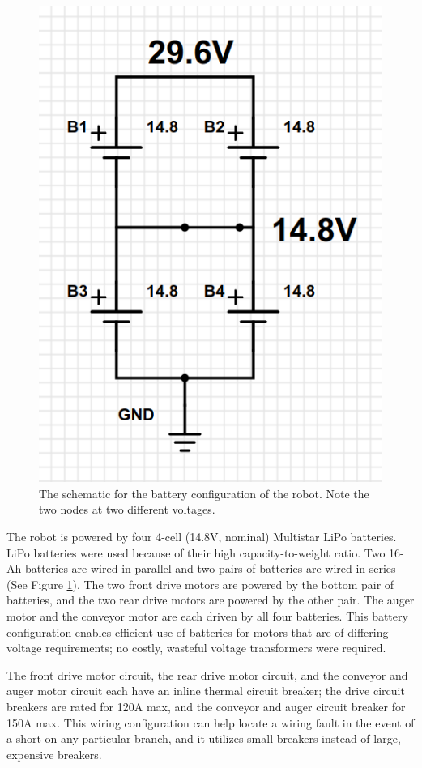 \documentclass[class=article, crop=false]{standalone}
\begin{document}
	\FloatBarrier
	\begin{figure}
	\centering
	 \includegraphics[width=0.8\linewidth]{09_Figures/power-config.jpg}
	 \caption{The schematic for the battery configuration of the robot. Note the two nodes at two different voltages.}
	 \label{fig:power-config}
	\end{figure}
	\FloatBarrier
	
	The robot is powered by four 4-cell (14.8V, nominal) Multistar LiPo batteries. LiPo batteries were used because of their high capacity-to-weight ratio. Two 16-Ah batteries are wired in parallel and two pairs of batteries are wired in series (See Figure \ref{fig:power-config}). The two front drive motors are powered by the bottom pair of batteries, and the two rear drive motors are powered by the other pair. The auger motor and the conveyor motor are each driven by all four batteries. This battery configuration enables efficient use of batteries for motors that are of differing voltage requirements; no costly, wasteful voltage transformers were required. 

	The front drive motor circuit, the rear drive motor circuit, and the conveyor and auger motor circuit each have an inline thermal circuit breaker; the drive circuit breakers are rated for 120A max, and the conveyor and auger circuit breaker for 150A max. This wiring configuration can help locate a wiring fault in the event of a short on any particular branch, and it utilizes small breakers instead of large, expensive breakers. 
\end{document}
